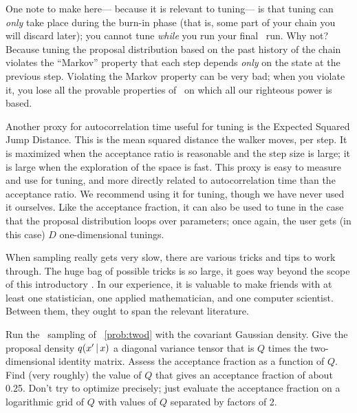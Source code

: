 \documentclass[modern]{aastex61}
\newcommand{\MCMC}{\acronym{MCMC}}
\begin{document}
One note to make here---%
  because it is relevant to tuning---%
  is that tuning can \emph{only} take place during the burn-in phase
  (that is, some part of your chain you will discard later);
  you cannot tune \emph{while} you run your final \MCMC\ run.
Why not?
Because tuning the proposal distribution based on the past history of the chain
  violates the ``Markov'' property
  that each step depends \emph{only} on the state at the previous step.
Violating the Markov property can be very bad;
  when you violate it,
  you lose all the provable properties of \MCMC\
  on which all our righteous power is based.

Another proxy for autocorrelation time useful for tuning is the
  Expected Squared Jump Distance.
This is the mean squared distance the walker moves, per step.
It is maximized when the acceptance ratio is reasonable
  and the step size is large;
  it is large when the exploration of the space is fast.
This proxy is easy to measure and use for tuning,
  and more directly related to autocorrelation time than the acceptance ratio.
We recommend using it for tuning, though we have never used it ourselves.
Like the acceptance fraction, it can also be used to tune
  in the case that the proposal distribution loops over parameters;
  once again, the user gets (in this case) $D$ one-dimensional tunings.

When sampling really gets very slow,
  there are various tricks and tips to work through.
The huge bag of possible tricks is so large,
  it goes way beyond the scope of this introductory \documentname.
In our experience, it is valuable to make friends with at least one
  statistician, one applied mathematician, and one computer scientist.
Between them, they ought to span the relevant literature.

\begin{problem}\label{prob:tuning}
Run the \MCMC\ sampling of \problemname~\ref{prob:twod} with the
covariant Gaussian density.
Give the proposal density $q(x'\,|\, x)$ a diagonal variance
tensor that is $Q$ times the two-dimensional identity matrix.
Assess the acceptance fraction as a function of $Q$.
Find (very roughly) the value of $Q$ that gives an acceptance
fraction of about 0.25.
Don't try to optimize precisely; just evaluate the acceptance fraction
on a logarithmic grid of $Q$ with values of $Q$ separated by factors
of 2.
\end{problem}
\end{document}
